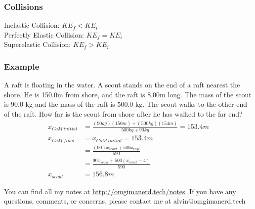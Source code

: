 \documentclass{math}
\begin{document}
\subsubsection*{Collisions}
Inelastic Collision: \( KE_f < KE_i \) \\
Perfectly Elastic Collision: \( KE_f = KE_i \) \\
Superelastic Collision: \( KE_f > KE_i \)

\subsubsection*{Example}
A raft is floating in the water. A scout stands on the end of a raft nearest
the shore. He is 150.0m from shore, and the raft is 8.00m long. The mass of the
scout is 90.0 kg and the mass of the raft is 500.0 kg. The scout walks to the
other end of the raft. How far is the scout from shore after he has walked to
the far end?
\begin{align*}
  x_{CoM~initial} &= \frac{(90kg)(150m)+(500kg)(154m)}{500kg+90kg} = 153.4m \\
  x_{CoM~final} &= x_{CoM~initial} = 153.4m \\
  &= \frac{(90)x_{scout}+500x_{raft}}{590} \\
  &= \frac{90x_{scout}+500(x_{scout}-4)}{590} \\
  x_{scout} &= 156.8m
\end{align*}

\begin{center}
  You can find all my notes at \url{http://omgimanerd.tech/notes}. If you have
  any questions, comments, or concerns, please contact me at
  alvin@omgimanerd.tech
\end{center}
\end{document}
